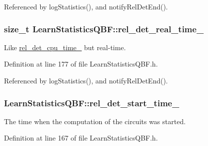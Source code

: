 Referenced by log\-Statistics(), and notify\-Rel\-Det\-End().

\hypertarget{classLearnStatisticsQBF_a2de1d6eb803d78fdf775b8d703adda69}{
\subsubsection[{rel\-\_\-det\-\_\-real\-\_\-time\-\_\-}]{\setlength{\rightskip}{0pt plus 5cm}size\-\_\-t Learn\-Statistics\-Q\-B\-F\-::rel\-\_\-det\-\_\-real\-\_\-time\-\_\-\hspace{0.3cm}{\ttfamily [protected]}}}\label{classLearnStatisticsQBF_a2de1d6eb803d78fdf775b8d703adda69}


Like \hyperlink{classLearnStatisticsQBF_a38d959613268b6a6aa0decfcbe5d631c}{rel\-\_\-det\-\_\-cpu\-\_\-time\-\_\-} but real-\/time. 



Definition at line 177 of file Learn\-Statistics\-Q\-B\-F.\-h.



Referenced by log\-Statistics(), and notify\-Rel\-Det\-End().

\hypertarget{classLearnStatisticsQBF_a11e1295e566e5456cdb2aca0034bf306}{
\subsubsection[{rel\-\_\-det\-\_\-start\-\_\-time\-\_\-}]{ Learn\-Statistics\-Q\-B\-F\-::rel\-\_\-det\-\_\-start\-\_\-time\-\_\-\hspace{0.3cm}{\ttfamily [protected]}}}\label{classLearnStatisticsQBF_a11e1295e566e5456cdb2aca0034bf306}


The time when the computation of the circuits was started. 



Definition at line 167 of file Learn\-Statistics\-Q\-B\-F.\-h.



